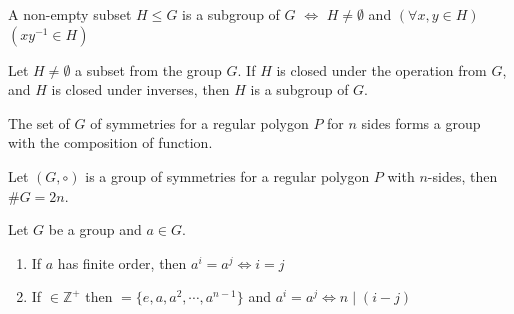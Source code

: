 \begin{assignment}[
  header=HeaderA,
  body=BodyA,
  title={Proved Theorems in  Group Theory},
  duedate={\today},
  toc=false,
  toctitle={This appears on the Table of contents.},
  exlist=false
]




\begin{mtheorem}
A non-empty subset $H \leq G$ is a subgroup of $G$ $\iff$ $H \neq \emptyset$ and $ (\forall x,y \in H)$$(xy^{-1} \in H)$
\end{mtheorem}

\begin{mtheorem}
Let $H \neq \emptyset$ a subset from the group $G$. If $H$ is closed under the operation from $G$, and $H$ is closed under inverses, then $H$ is a subgroup of $G$.
\end{mtheorem}



\begin{mtheorem}[5][][thm:5]
The set of $G$ of symmetries for a regular polygon $P$ for $n$ sides forms a group with the composition of function.
\end{mtheorem}

\begin{mtheorem}[ 6][][thm:6]
Let $(G, \circ)$ is a group of symmetries for a regular polygon $P$ with $n$-sides, then $\# G = 2n$.
\end{mtheorem}

\begin{mtheorem}[ 9][][thm:9]
Let $G$ be a group and $a \in G$. 
\begin{enumerate}
    \item[*] If $a$ has finite order, then $a^i = a^j \iff i = j$
    \item[**] If  $\in \mathbb{Z}^+$ then $=\{e,a,a^2,\cdots, a^{n-1}\}$ and $a^i = a^j \iff n \mid (i-j)$
\end{enumerate}
\end{mtheorem}


\end{assignment}

